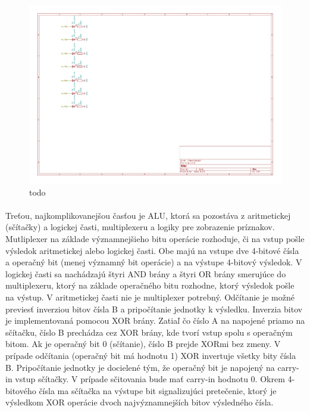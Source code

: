 \documentclass{article}
\begin{document}
    \begin{figure}[h!]
        \centering
        \includegraphics[width=.9\linewidth]{output_sheet.pdf}
        \caption{todo}
    \end{figure}

    \paragraph{}
    Treťou, najkomplikovanejšou časťou je ALU, ktorá sa pozostáva z aritmetickej (sčítačky) a logickej časti, multiplexeru a logiky pre zobrazenie príznakov. Mutliplexer na základe významnejšieho bitu operácie rozhoduje, či na vstup pošle výsledok aritmetickej alebo logickej časti. Obe majú na vstupe dve 4-bitové čísla a operačný bit (menej významný bit operácie) a na výstupe 4-bitový výsledok. V logickej časti sa nachádzajú štyri AND brány a štyri OR brány smerujúce do multiplexeru, ktorý na základe operačného bitu rozhodne, ktorý výsledok pošle na výstup. V aritmetickej časti nie je multiplexer potrebný. Odčítanie je možné previesť inverziou bitov čísla B a pripočítanie jednotky k výsledku. Inverzia bitov je implementovaná pomocou XOR brány. Zatiaľ čo číslo A na napojené priamo na sčítačku, číslo B prechádza cez XOR brány, kde tvorí vstup spolu s operačným bitom. Ak je operačný bit 0 (sčítanie), číslo B prejde XORmi bez zmeny. V prípade odčítania (operačný bit má hodnotu 1) XOR invertuje všetky bity čísla B. Pripočítanie jednotky je docielené tým, že operačný bit je napojený na carry-in vstup sčítačky. V prípade sčitovania bude mať carry-in hodnotu 0. Okrem 4-bitového čísla ma sčítačka na výstupe bit signalizujúci pretečenie, ktorý je výsledkom XOR operácie dvoch najvýznamnejších bitov výsledného čísla.
\end{document}
